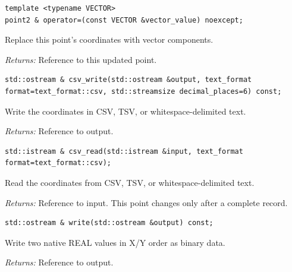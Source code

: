 \par\noindent\begin{minipage}{\linewidth}
\begin{lstlisting}[style=apireference]
template <typename VECTOR>
point2 & operator=(const VECTOR &vector_value) noexcept;
\end{lstlisting}
{\footnotesize Replace this point's coordinates with vector components.\par}
{\footnotesize\textit{Returns:} Reference to this updated point.\par}
\end{minipage}\par\vspace{1pt}
\par\noindent\begin{minipage}{\linewidth}
\begin{lstlisting}[style=apireference]
std::ostream & csv_write(std::ostream &output, text_format format=text_format::csv, std::streamsize decimal_places=6) const;
\end{lstlisting}
{\footnotesize Write the coordinates in CSV, TSV, or whitespace-delimited text.\par}
{\footnotesize\textit{Returns:} Reference to output.\par}
\end{minipage}\par\vspace{1pt}
\par\noindent\begin{minipage}{\linewidth}
\begin{lstlisting}[style=apireference]
std::istream & csv_read(std::istream &input, text_format format=text_format::csv);
\end{lstlisting}
{\footnotesize Read the coordinates from CSV, TSV, or whitespace-delimited text.\par}
{\footnotesize\textit{Returns:} Reference to input. This point changes only after a complete record.\par}
\end{minipage}\par\vspace{1pt}
\par\noindent\begin{minipage}{\linewidth}
\begin{lstlisting}[style=apireference]
std::ostream & write(std::ostream &output) const;
\end{lstlisting}
{\footnotesize Write two native REAL values in X/Y order as binary data.\par}
{\footnotesize\textit{Returns:} Reference to output.\par}
\end{minipage}\par\vspace{1pt}
